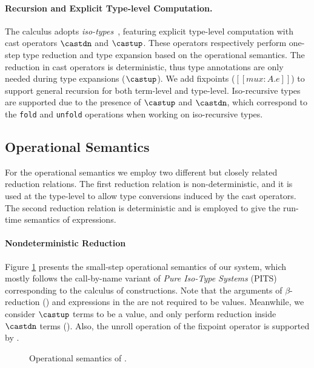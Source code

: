 \paragraph{Recursion and Explicit Type-level Computation.}
\label{sec:cast}
The \name calculus adopts \emph{iso-types}~\cite{yang2016unified,yang2019pure},
featuring explicit type-level computation with cast operators
$\castdn$ and $\castup$. These operators respectively perform one-step
type reduction and type expansion based on the operational semantics.
The reduction in cast operators is deterministic, thus type
annotations are only needed during type expansions ($\castup$). We add
fixpoints ($[[mu x : A. e]]$) to support general recursion for both
term-level and type-level. Iso-recursive types are supported due to
the presence of $\castup$ and $\castdn$, which correspond to the
\verb|fold| and \verb|unfold| operations when working on iso-recursive types.

\subsection{Operational Semantics}

For the operational semantics we employ two different but closely related
reduction relations. The first reduction relation is non-deterministic, and
it is used at the type-level to allow type conversions induced
by the cast operators. The second reduction relation is deterministic and
is employed to give the run-time semantics of expressions.

\paragraph{Nondeterministic Reduction}
Figure \ref{fig:semantics} presents the small-step operational semantics of our system,
which mostly follows the call-by-name variant of \emph{Pure Iso-Type Systems} (PITS)
~\cite{yang2019pure} corresponding to the calculus of constructions.
Note that the arguments of $\beta$-reduction () and expressions in
the  are not required to be values.
Meanwhile, we consider $\castup$ terms to be a value,
and only perform reduction inside $\castdn$ terms (). Also, the unroll
operation of the fixpoint operator is supported by .

\begin{figure}[t]
    \centering


    \caption{Operational semantics of \name.}
    \label{fig:semantics}
\end{figure}

